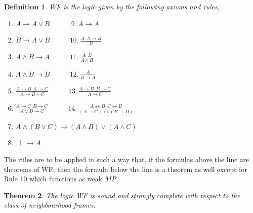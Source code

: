 \documentclass[12pt]{article}
\newtheorem{thm}{Theorem}[section]
\newtheorem{dfn}[thm]{Definition}
\begin{document}
\begin{dfn}
{\sf WF} is the logic given by the following axioms and rules,
\begin{enumerate}
\item $ A\rightarrow A\vee B ~~~~~~~~~~~~~~\textit{9}.~A\rightarrow A$

\item $ B\rightarrow A\vee B ~~~~~~~~~~~~~ \textit{10}.~\frac{A ~~A\rightarrow B}{B}$

\item $ A\wedge B \rightarrow A ~~~~~~~~~~~~~\textit{11}.~ \frac{A~~B}{A\wedge B}$

\item $ A\wedge B \rightarrow B~~~~~~~~~~~~~\textit{12} .~ \frac{A}{B\rightarrow A}$

\item $ \frac{A\rightarrow B~~A\rightarrow C}{A\rightarrow B\wedge C}~~~~~~~~~~~~~\textit{13} .~ \frac{A\rightarrow B~~B\rightarrow C}{A\rightarrow C}$

\item $ \frac{A\rightarrow C~~B\rightarrow C}{A\vee B \rightarrow  C}~~~~~~~~~~~~~\textit{14} .~\frac{A\leftrightarrow B~~C\leftrightarrow D}{(A\rightarrow C)\leftrightarrow (B\rightarrow D)} $

\item $A\wedge (B\vee C)\rightarrow (A\wedge B) \vee(A\wedge C)  ~~~~~~~~~~~~~~~~~~$

\item $ \perp\rightarrow A $
\end{enumerate}
\end{dfn}
The rules are to be applied in such a way that, if the formulas above the line are theorems of {\sf WF}, then the formula below the line is a theorem as well except for Rule 10 which functions as weak $M\!P$.

\begin{thm}%
The logic {\sf WF} is sound and strongly complete with respect to the class of neighbourhood frames.
\end{thm}
\end{document}
